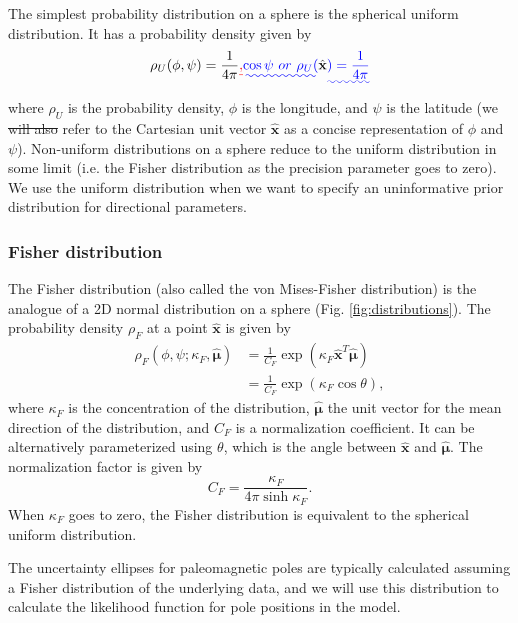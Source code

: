 \documentclass[]{agujournal2019}
\providecommand{\DIFadd}[1]{{\protect\color{blue}\uwave{#1}}} %
\providecommand{\DIFdel}[1]{{\protect\color{red}\sout{#1}}}                      %
\providecommand{\DIFaddbegin}{} %
\providecommand{\DIFaddend}{} %
\providecommand{\DIFdelbegin}{} %
\providecommand{\DIFdelend}{} %
\begin{document}
The simplest probability distribution on a sphere is the spherical uniform distribution. It has a probability density given by
\begin{equation}
  \rho_U(\phi, \psi) = \frac{1}{4 \pi} \DIFdelbegin \DIFdel{,
}\DIFdelend \DIFaddbegin \DIFadd{\cos \psi 
\ or \
  \rho_U(}\hat{\mathbf{x}}\DIFadd{) = \frac{1}{4 \pi}
}\DIFaddend \end{equation}
where $\rho_U$ is the probability density, $\phi$ is the longitude, and $\psi$ is the latitude (we \DIFdelbegin \DIFdel{will also }\DIFdelend refer to the Cartesian unit vector $\hat{\mathbf{x}}$ as a concise representation of $\phi$ and $\psi$). Non-uniform distributions on a sphere reduce to the uniform distribution in some limit (i.e. the Fisher distribution as the precision parameter goes to zero). We use the uniform distribution when we want to specify an uninformative prior distribution for directional parameters.

\subsubsection*{Fisher distribution}
The Fisher distribution (also called the von Mises-Fisher distribution) is the analogue of a 2D normal distribution on a sphere (Fig. \ref{fig:distributions}). The probability density $\rho_F$ at a point $\hat{\mathbf{x}}$ is given by
\begin{equation}
  \begin{aligned}
  \rho_F(\phi, \psi ; \kappa_F, \hat{\mathbf{\mu}}) 
  &= \frac{1}{C_F} \exp \left( \kappa_F \hat{\mathbf{x}}^T \hat{\mathbf{\mu}} \right) \\
  &= \frac{1}{C_F} \exp \left( \kappa_F \cos \theta \right),
  \end{aligned}
\end{equation}
where $\kappa_F$ is the concentration of the distribution, 
$\hat{\mathbf{\mu}}$ the unit vector for the mean direction of the distribution, and $C_F$ is a normalization coefficient. It can be alternatively parameterized using $\theta$, which is the angle between $\hat{\mathbf{x}}$ and $\hat{\mathbf{\mu}}$.
The normalization factor is given by 
\begin{equation}
  C_F = \frac{\kappa_F}{4 \pi \sinh{\kappa_F}}.
\end{equation}
When $\kappa_F$ goes to zero, the Fisher distribution is equivalent to the spherical uniform distribution.

The uncertainty ellipses for paleomagnetic poles are typically calculated assuming a Fisher distribution of the underlying data, and we will use this distribution to calculate the likelihood function for pole positions in the model.
\end{document}
